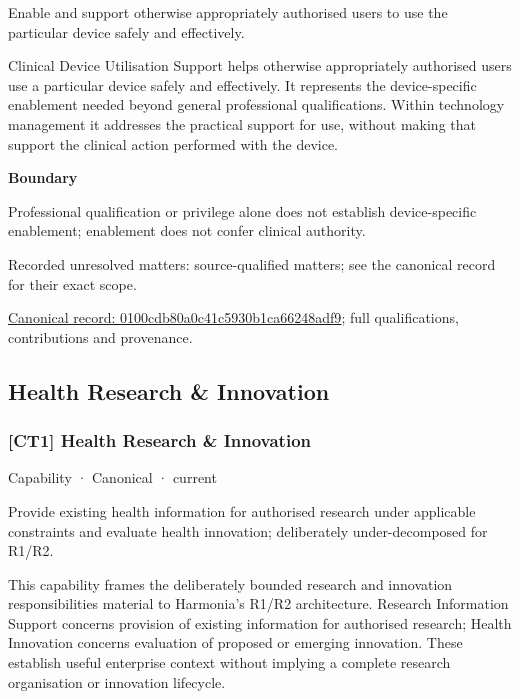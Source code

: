 Enable and support otherwise appropriately authorised users to use the particular device safely and effectively.



Clinical Device Utilisation Support helps otherwise appropriately authorised users use a particular device safely and effectively. It represents the device-specific enablement needed beyond general professional qualifications. Within technology management it addresses the practical support for use, without making that support the clinical action performed with the device.



\textbf{Boundary}



Professional qualification or privilege alone does not establish device-specific enablement; enablement does not confer clinical authority.


{\small Recorded unresolved matters: source-qualified matters; see the canonical record for their exact scope.}\par
{\footnotesize \href{../../../../continuum/strategy/capability/0100cdb80a0c41c5930b1ca66248adf9.md}{Canonical record: 0100cdb80a0c41c5930b1ca66248adf9}; full qualifications, contributions and provenance.}\par
\subsection{Health Research \& Innovation}

\subsubsection{[CT1] Health Research \& Innovation}

\label{element:582bf62145fd42118e5d57bb714841e8}
{\small Capability · Canonical · current}\par

Provide existing health information for authorised research under applicable constraints and evaluate health innovation; deliberately under-decomposed for R1/R2.



This capability frames the deliberately bounded research and innovation responsibilities material to Harmonia's R1/R2 architecture. Research Information Support concerns provision of existing information for authorised research; Health Innovation concerns evaluation of proposed or emerging innovation. These establish useful enterprise context without implying a complete research organisation or innovation lifecycle.



